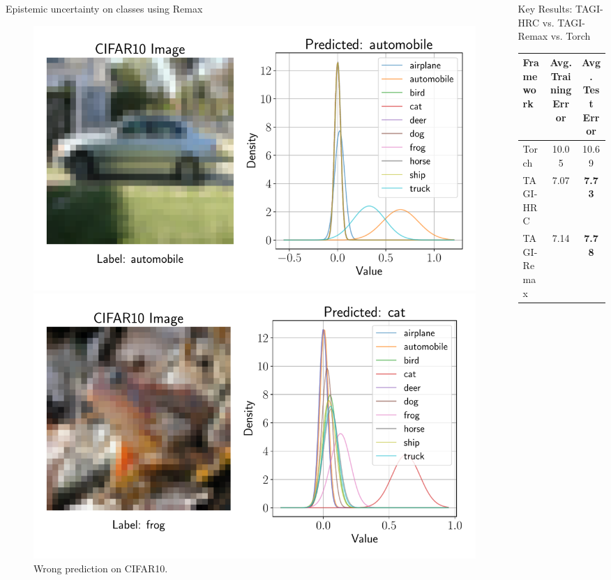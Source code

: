 \documentclass[final]{beamer}
\begin{document}
\begin{frame}[t]
\begin{columns}
\begin{column}[T]{.31\textwidth}
\begin{block}{Epistemic uncertainty on classes using Remax}
\begin{figure}[h]
    \centering
    \begin{minipage}[b]{0.5\textwidth}
        \includegraphics[width=\textwidth]{automobile}
        \caption*{Correct prediction on CIFAR10.}
    \end{minipage}\hfill
    \begin{minipage}[b]{0.5\textwidth}
        \includegraphics[width=\textwidth]{frog}
        \caption*{Wrong prediction on CIFAR10.}
    \end{minipage}
\end{figure}

\end{block}
\end{column}
\begin{column}[T]{.31\textwidth}

\begin{block}{Key Results: TAGI-HRC vs. TAGI-Remax vs. Torch}
\centering
\begin{tabular}{lcc}
\toprule
Framework & Avg. Training Error & Avg. Test Error \\
\midrule
Torch      & 10.05 & 10.69 \\
TAGI-HRC       & 7.07  & \textbf{7.73} \\
TAGI-Remax & 7.14  & \textbf{7.78} \\
\bottomrule
\end{tabular}
\end{block}


\end{column}
\end{columns}
\end{frame}
\end{document}
